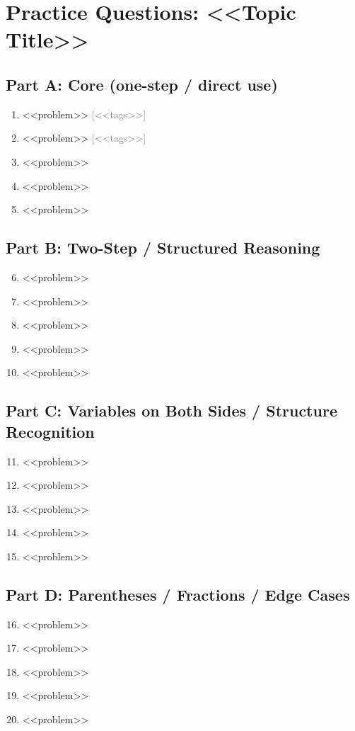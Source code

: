 \documentclass[12pt]{article}
\newcommand{\qtag}[1]{\textcolor{gray}{\footnotesize [#1]}}
\newenvironment{PracticePart}[1]{%
  \subsection*{Part #1}%
  \begin{enumerate}
}{%
  \end{enumerate}
}
\newenvironment{SpeedCheck}{%
  \subsection*{Speed Check (3 quick items)}
  \begin{enumerate}
}{%
  \end{enumerate}
}
\begin{document}
\newpage

\section*{Practice Questions: <<Topic Title>>}


\begin{PracticePart}{A: Core (one-step / direct use)}
  \item <<problem>> \qtag{<<tags>>}
  \item <<problem>> \qtag{<<tags>>}
  \item <<problem>>
  \item <<problem>>
  \item <<problem>>
\end{PracticePart}

\begin{PracticePart}{B: Two-Step / Structured Reasoning}
  \setcounter{enumi}{5}
  \item <<problem>>
  \item <<problem>>
  \item <<problem>>
  \item <<problem>>
  \item <<problem>>
\end{PracticePart}

\begin{PracticePart}{C: Variables on Both Sides / Structure Recognition}
  \setcounter{enumi}{10}
  \item <<problem>>
  \item <<problem>>
  \item <<problem>>
  \item <<problem>>
  \item <<problem>>
\end{PracticePart}

\begin{PracticePart}{D: Parentheses / Fractions / Edge Cases}
  \setcounter{enumi}{15}
  \item <<problem>>
  \item <<problem>>
  \item <<problem>>
  \item <<problem>>
  \item <<problem>>
\end{PracticePart}
\end{document}
